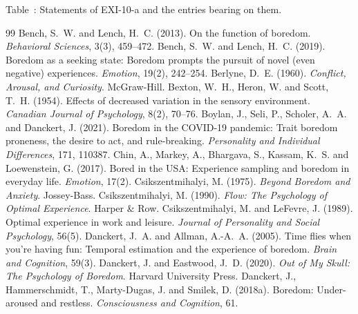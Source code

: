 \documentclass{situationist-preprint}
\begin{document}
\begin{center}\label{tab:clauses}Table~\thetable: Statements of EXI-10-a and the entries bearing on them.\end{center}


\begin{thebibliography}{99}\small
{} Bench, S.~W. and Lench, H.~C. (2013). On the function of boredom. \emph{Behavioral Sciences}, 3(3), 459--472.
 Bench, S.~W. and Lench, H.~C. (2019). Boredom as a seeking state: Boredom prompts the pursuit of novel (even negative) experiences. \emph{Emotion}, 19(2), 242--254.
 Berlyne, D.~E. (1960). \emph{Conflict, Arousal, and Curiosity}. McGraw-Hill.
 Bexton, W.~H., Heron, W. and Scott, T.~H. (1954). Effects of decreased variation in the sensory environment. \emph{Canadian Journal of Psychology}, 8(2), 70--76.
 Boylan, J., Seli, P., Scholer, A.~A. and Danckert, J. (2021). Boredom in the COVID-19 pandemic: Trait boredom proneness, the desire to act, and rule-breaking. \emph{Personality and Individual Differences}, 171, 110387.
 Chin, A., Markey, A., Bhargava, S., Kassam, K.~S. and Loewenstein, G. (2017). Bored in the USA: Experience sampling and boredom in everyday life. \emph{Emotion}, 17(2).
 Csikszentmihalyi, M. (1975). \emph{Beyond Boredom and Anxiety}. Jossey-Bass.
 Csikszentmihalyi, M. (1990). \emph{Flow: The Psychology of Optimal Experience}. Harper \& Row.
 Csikszentmihalyi, M. and LeFevre, J. (1989). Optimal experience in work and leisure. \emph{Journal of Personality and Social Psychology}, 56(5).
 Danckert, J.~A. and Allman, A.-A.~A. (2005). Time flies when you're having fun: Temporal estimation and the experience of boredom. \emph{Brain and Cognition}, 59(3).
 Danckert, J. and Eastwood, J.~D. (2020). \emph{Out of My Skull: The Psychology of Boredom}. Harvard University Press.
 Danckert, J., Hammerschmidt, T., Marty-Dugas, J. and Smilek, D. (2018a). Boredom: Under-aroused and restless. \emph{Consciousness and Cognition}, 61.

\end{thebibliography}
\end{document}
